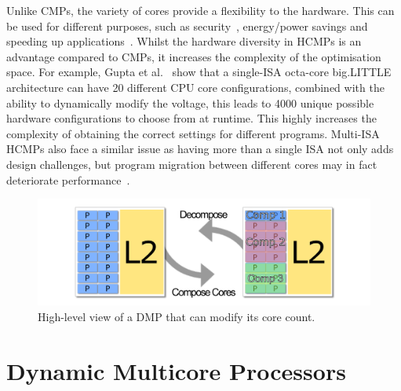 Unlike CMPs, the variety of cores provide a flexibility to the hardware.
This can be used for different purposes, such as security~\cite{venkatHipstr2016}, energy/power savings and speeding up applications~\cite{venkat2014harnessingisa}.
Whilst the hardware diversity in HCMPs is an advantage compared to CMPs, it increases the complexity of the optimisation space.
For example, Gupta et al.~\cite{Gupta2017Dypo} show that a single-ISA octa-core big.LITTLE architecture can have 20 different CPU core configurations, combined with the ability to dynamically modify the voltage, this leads to 4000 unique possible hardware configurations to choose from at runtime.
This highly increases the complexity of obtaining the correct settings for different programs.
Multi-ISA HCMPs also face a similar issue as having more than a single ISA not only adds design challenges, but program migration between different cores may in fact deteriorate performance~\cite{DeVuystMigration2012}.

\begin{figure}[t]
    \centering
    \includegraphics[width=1\textwidth]{background/graphics/cmp_new.pdf}
	\vspace{-3em}
    \caption{High-level view of a DMP that can modify its core count.}
    \label{fig:dynmulticore}
	\vspace{-0.5em}
\end{figure}

\vspace{-1em}
\section{Dynamic Multicore Processors}~\label{sec:dmp}
\vspace{-1em}

